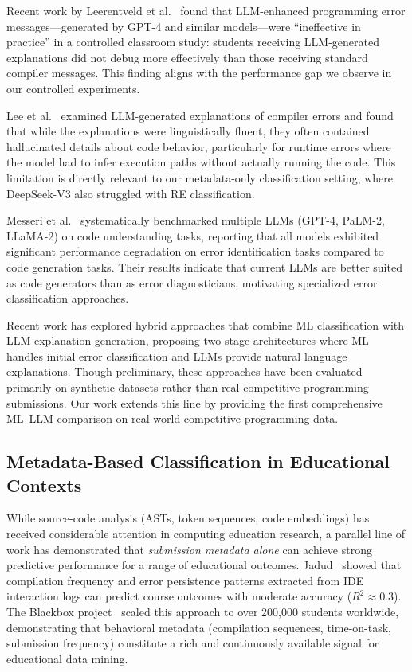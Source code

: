 \documentclass[10pt,a4paper]{article}
\begin{document}
Recent work by Leerentveld et al.~\cite{leerentveld2024not}
found that LLM-enhanced programming error messages---generated by GPT-4 and
similar models---were ``ineffective in practice'' in a controlled classroom
study: students receiving LLM-generated explanations did not debug more
effectively than those receiving standard compiler messages. This finding
aligns with the performance gap we observe in our controlled experiments.

Lee et al.~\cite{lee2024code}
examined LLM-generated explanations of compiler errors and found that while
the explanations were linguistically fluent, they often contained
hallucinated details about code behavior, particularly for runtime errors
where the model had to infer execution paths without actually running the
code. This limitation is directly relevant to our metadata-only
classification setting, where DeepSeek-V3 also struggled with RE
classification.

Messeri et al.~\cite{prather2024code} systematically benchmarked multiple
LLMs (GPT-4, PaLM-2, LLaMA-2) on code understanding tasks, reporting that
all models exhibited significant performance degradation on error
identification tasks compared to code generation tasks. Their results indicate
that current LLMs are better suited as code generators than as error
diagnosticians, motivating specialized error classification
approaches.

Recent work has explored hybrid approaches that combine ML classification
with LLM explanation generation, proposing two-stage architectures where
ML handles initial error classification and LLMs provide natural language
explanations. Though preliminary, these approaches have been evaluated primarily
on synthetic datasets rather than real competitive programming submissions.
Our work extends this line by providing the first comprehensive ML--LLM
comparison on real-world competitive programming data.

\subsection{Metadata-Based Classification in Educational Contexts}

While source-code analysis (ASTs, token sequences, code embeddings) has
received considerable attention in computing education research, a parallel
line of work has demonstrated that \textit{submission metadata alone} can
achieve strong predictive performance for a range of educational outcomes.
Jadud~\cite{jadud2006methods} showed that compilation frequency and
error persistence patterns extracted from IDE interaction logs can predict
course outcomes with moderate accuracy ($R^2 \approx 0.3$). The Blackbox
project~\cite{bey2022analyzing} scaled this approach to over 200,000
students worldwide, demonstrating that behavioral metadata (compilation
sequences, time-on-task, submission frequency) constitute a rich and
continuously available signal for educational data mining.
\end{document}
